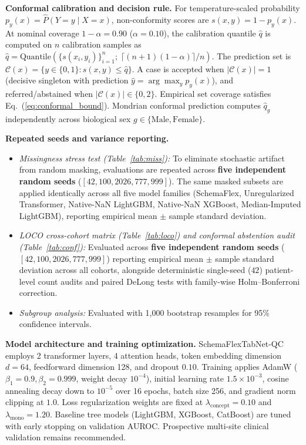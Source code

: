 \documentclass[journal]{IEEEtran}
\newcommand{\sfn}{SchemaFlexTabNet-QC}
\begin{document}
\textbf{Conformal calibration and decision rule.} For temperature-scaled probability $p_y(x) = \hat{P}(Y=y \mid X=x)$, non-conformity scores are $s(x,y)=1-p_y(x)$. At nominal coverage $1-\alpha=0.90$ ($\alpha=0.10$), the calibration quantile $\hat{q}$ is computed on $n$ calibration samples as $\hat{q} = \mathrm{Quantile}(\{s(x_i,y_i)\}_{i=1}^n; \; \lceil (n+1)(1-\alpha) \rceil / n)$. The prediction set is $\mathcal{C}(x) = \{y \in \{0,1\} : s(x,y) \le \hat{q}\}$. A case is accepted when $|\mathcal{C}(x)|=1$ (decisive singleton with prediction $\hat{y}=\arg\max_y p_y(x)$), and referred/abstained when $|\mathcal{C}(x)|\in\{0,2\}$. Empirical set coverage satisfies Eq.~(\ref{eq:conformal_bound}). Mondrian conformal prediction computes $\hat{q}_g$ independently across biological sex $g\in\{\mathrm{Male},\mathrm{Female}\}$.

\textbf{Repeated seeds and variance reporting.}
\begin{itemize}
\item \emph{Missingness stress test (Table~\ref{tab:miss}):} To eliminate stochastic artifact from random masking, evaluations are repeated across \textbf{five independent random seeds} ($[42, 100, 2026, 777, 999]$). The same masked subsets are applied identically across all five model families (SchemaFlex, Unregularized Transformer, Native-NaN LightGBM, Native-NaN XGBoost, Median-Imputed LightGBM), reporting empirical mean $\pm$ sample standard deviation.
\item \emph{LOCO cross-cohort matrix (Table~\ref{tab:loco}) and conformal abstention audit (Table~\ref{tab:conf}):} Evaluated across \textbf{five independent random seeds} ($[42, 100, 2026, 777, 999]$) reporting empirical mean $\pm$ sample standard deviation across all cohorts, alongside deterministic single-seed ($42$) patient-level count audits and paired DeLong tests with family-wise Holm--Bonferroni correction.
\item \emph{Subgroup analysis:} Evaluated with 1{,}000 bootstrap resamples for 95\% confidence intervals.
\end{itemize}

\textbf{Model architecture and training optimization.} \sfn{} employs 2 transformer layers, 4 attention heads, token embedding dimension $d=64$, feedforward dimension 128, and dropout $0.10$. Training applies AdamW ($\beta_1=0.9, \beta_2=0.999$, weight decay $10^{-4}$), initial learning rate $1.5\times 10^{-3}$, cosine annealing decay down to $10^{-5}$ over 16 epochs, batch size 256, and gradient norm clipping at $1.0$. Loss regularization weights are fixed at $\lambda_{\mathrm{concept}}=0.10$ and $\lambda_{\mathrm{mono}}=1.20$. Baseline tree models (LightGBM, XGBoost, CatBoost) are tuned with early stopping on validation AUROC. Prospective multi-site clinical validation remains recommended.
\end{document}
